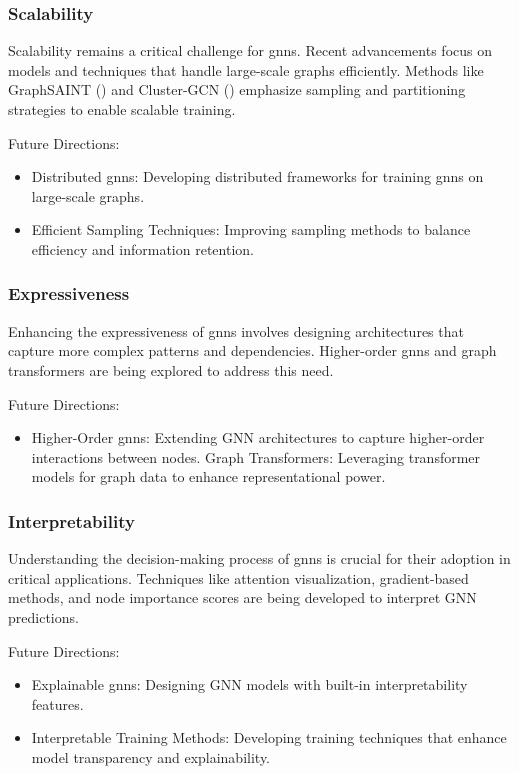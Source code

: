 \subsubsection*{Scalability}

Scalability remains a critical challenge for \glspl{gnn}. Recent advancements focus on models and techniques that handle large-scale graphs efficiently. Methods like GraphSAINT (\cite{Zeng2019}) and Cluster-GCN (\cite{Chiang2019}) emphasize sampling and partitioning strategies to enable scalable training.

Future Directions:
\begin{itemize}
    \item Distributed \glspl{gnn}: Developing distributed frameworks for training \glspl{gnn} on large-scale graphs.
    \item Efficient Sampling Techniques: Improving sampling methods to balance efficiency and information retention.
\end{itemize}


\subsubsection*{Expressiveness}

Enhancing the expressiveness of \glspl{gnn} involves designing architectures that capture more complex patterns and dependencies. Higher-order \glspl{gnn} and graph transformers are being explored to address this need.

Future Directions:
\begin{itemize}
    \item Higher-Order \glspl{gnn}: Extending GNN architectures to capture higher-order interactions between nodes.
    Graph Transformers: Leveraging transformer models for graph data to enhance representational power.
\end{itemize}

\subsubsection*{Interpretability}

Understanding the decision-making process of \glspl{gnn} is crucial for their adoption in critical applications. Techniques like attention visualization, gradient-based methods, and node importance scores are being developed to interpret GNN predictions.

Future Directions:
\begin{itemize}
    \item Explainable \glspl{gnn}: Designing GNN models with built-in interpretability features.
    \item Interpretable Training Methods: Developing training techniques that enhance model transparency and explainability.
\end{itemize}

